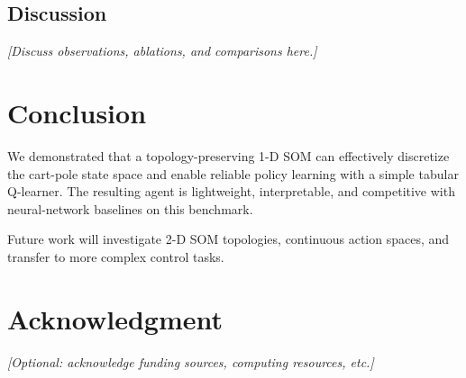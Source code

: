 \documentclass[conference]{IEEEtran}
\begin{document}
\subsection{Discussion}

\textit{[Discuss observations, ablations, and comparisons here.]}

\section{Conclusion}
\label{sec:conclusion}

We demonstrated that a topology-preserving 1-D SOM can effectively discretize
the cart-pole state space and enable reliable policy learning with a simple
tabular Q-learner.
The resulting agent is lightweight, interpretable, and competitive with
neural-network baselines on this benchmark.

Future work will investigate 2-D SOM topologies, continuous action spaces,
and transfer to more complex control tasks.

\section*{Acknowledgment}

\textit{[Optional: acknowledge funding sources, computing resources, etc.]}



\end{document}
